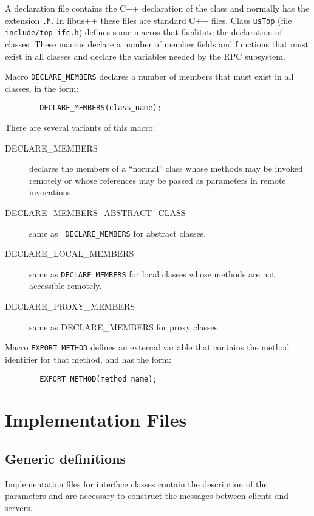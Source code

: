 A declaration file contains the C++ declaration of the class and
normally has the extension {\tt .h}. In libus++ these files are
standard C++ files. Class {\tt usTop} (file {\tt include/top\_ifc.h})
defines some macros that facilitate the declaration of classes.
These macros declare a number of member fields and functions that must
exist in all classes and declare the variables needed by the RPC
subsystem. 

Macro {\tt DECLARE\_MEMBERS} declares a number of members that
must exist in all classes, in the form:

\begin{verbatim}
        DECLARE_MEMBERS(class_name);
\end{verbatim}

There are several variants of this macro:
\begin{description}
\item[DECLARE\_MEMBERS] declares the members of a ``normal'' class
whose methods may be invoked remotely or whose references may be
passed as parameters in remote invocations.

\item[DECLARE\_MEMBERS\_ABSTRACT\_CLASS] same as {\tt
DECLARE\_MEMBERS} for abstract classes.

\item[DECLARE\_LOCAL\_MEMBERS] same as {\tt DECLARE\_MEMBERS} for
local classes whose methods are not accessible remotely.

\item[DECLARE\_PROXY\_MEMBERS] same as DECLARE\_MEMBERS for proxy classes.
\end{description}

Macro {\tt EXPORT\_METHOD} defines an external variable that contains
the method identifier for that method, and has the form:

\begin{verbatim}
        EXPORT_METHOD(method_name);
\end{verbatim}

\section{Implementation Files}

\subsection{Generic definitions}

Implementation files for interface classes contain the description of
the parameters and are necessary to construct the messages between
clients and servers.


